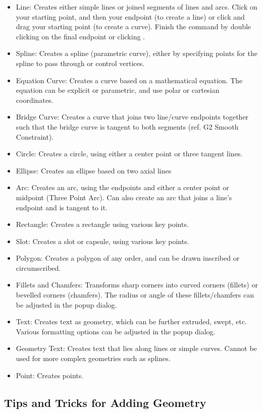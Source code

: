 \begin{itemize}
\item Line: Creates either simple lines or joined segments of lines and arcs. Click on your starting point, and then your endpoint (to create a line) or click and drag your starting point (to create a curve). Finish the command by double clicking on the final endpoint or clicking .
\item Spline: Creates a spline (parametric curve), either by specifying points for the spline to pass through or control vertices. 
\item Equation Curve: Creates a curve based on a mathematical equation. The equation can be explicit or parametric, and use polar or cartesian coordinates.
\item Bridge Curve: Creates a curve that joins two line/curve endpoints together such that the bridge curve is tangent to both segments (ref. G2 Smooth Constraint).
\item Circle: Creates a circle, using either a center point or three tangent lines.
\item Ellipse: Creates an ellipse based on two axial lines
\item Arc: Creates an arc, using the endpoints and either a center point or midpoint (Three Point Arc). Can also create an arc that joins a line's endpoint and is tangent to it.
\item Rectangle: Creates a rectangle using various key points.
\item Slot: Creates a slot or capsule, using various key points.
\item Polygon: Creates a polygon of any order, and can be drawn inscribed or circumscribed.
\item Fillets and Chamfers: Transforms sharp corners into curved corners (fillets) or bevelled corners (chamfers). The radius or angle of these fillets/chamfers can be adjusted in the popup dialog.
\item Text: Creates text as geometry, which can be further extruded, swept, etc. Various formatting options can be adjusted in the popup dialog.
\item Geometry Text: Creates text that lies along lines or simple curves. Cannot be used for more complex geometries such as splines.
\item Point: Creates points.
\cbend

\end{itemize}

\subsection{Tips and Tricks for Adding Geometry}

